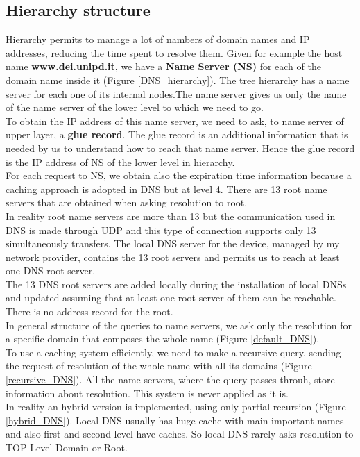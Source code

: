 \subsection{Hierarchy structure}
Hierarchy permits to manage a lot of nambers of domain names and IP addresses, reducing the time spent to resolve them. Given for example the host name \textbf{www.dei.unipd.it}, we have a \textbf{Name Server (NS)} for each of the domain name inside it (Figure \ref{DNS_hierarchy}). The tree hierarchy has a name server for each one of its internal nodes.The name server gives us only the name of the name server of the lower level to which we need to go.\\
To obtain the IP address of this name server, we need to ask, to name server of upper layer, a \textbf{glue record}. The glue record is an additional information that is needed by us to understand how to reach that name server. Hence the glue record is the IP address of NS of the lower level in hierarchy. \\
For each request to NS, we obtain also the expiration time information because a caching approach is adopted in DNS but at level 4. There are 13 root name servers that are obtained when asking resolution to root. \\
In reality root name servers are more than 13 but the communication used in DNS is made through UDP and this type of connection supports only 13 simultaneously transfers. The local DNS server for the device, managed by my network provider, contains the 13 root servers and permits us to reach at least one DNS root server.\\
The 13 DNS root servers are added locally during the installation of local DNSs and updated assuming that at least one root server of them can be reachable. There is no address record for the root.\\
In general structure of the queries to name servers, we ask only the resolution for a specific domain that composes the whole name (Figure \ref{default_DNS}).\\
To use a caching system efficiently, we need to make a recursive query, sending the request of resolution of the whole name with all its domains (Figure \ref{recursive_DNS}). All the name servers, where the query passes throuh, store information about resolution. This system is never applied as it is.\\
In reality an hybrid version is implemented, using only partial recursion (Figure \ref{hybrid_DNS}). Local DNS usually has huge cache with main important names and also first and second level have caches. So local DNS rarely asks resolution to TOP Level Domain or Root.\\
